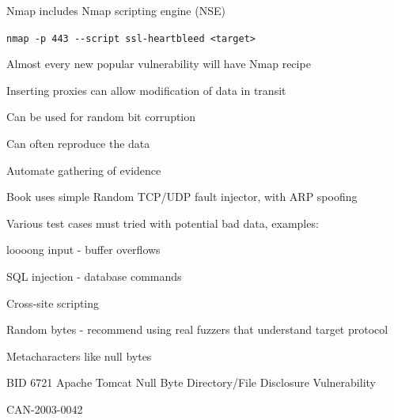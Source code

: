 \documentclass[Screen16to9,17pt]{foils}
\begin{document}

Nmap includes Nmap scripting engine (NSE)


\begin{list1}
\item \verb+nmap -p 443 --script ssl-heartbleed <target>+\\
\item Almost every new popular vulnerability will have Nmap recipe
\end{list1}



\begin{list1}
\item Inserting proxies can allow modification of data in transit
\item Can be used for random bit corruption
\item Can often reproduce the data
\item Automate gathering of evidence
\item Book uses simple Random TCP/UDP fault injector, with ARP spoofing
\item Various test cases must tried with potential bad data, examples:
\begin{list2}
\item loooong input - buffer overflows
\item SQL injection - database commands
\item Cross-site scripting
\item Random bytes - recommend using real fuzzers that understand target protocol
\item Metacharacters like null bytes
\end{list2}
\end{list1}




\begin{list1}
\item BID 6721 Apache Tomcat Null Byte Directory/File Disclosure Vulnerability
\item {}
\item CAN-2003-0042
\end{list1}
\end{document}
